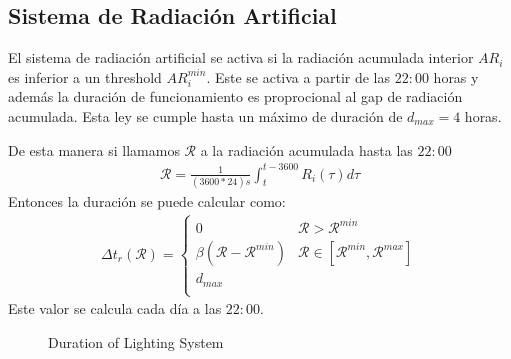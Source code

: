 \documentclass{article}
\newcommand{\R}{\mathcal{R}}
\begin{document}
\subsection{Sistema de Radiación Artificial}

El sistema de radiación artificial se activa si la radiación acumulada interior $AR_i$ es inferior a un threshold $AR_i^{min}$. Este se activa a partir de las $22:00$ horas y además la duración de funcionamiento es proprocional al gap de radiación acumulada. Esta ley se cumple hasta un máximo de duración de $d_{max}=4$ horas.

De esta manera si llamamos $\R$ a la radiación acumulada hasta las $22:00$
\begin{gather}
    \R = \frac{1}{(3600*24) s}\int_{t}^{t-3600} R_i(\tau)d\tau
\end{gather}
Entonces la duración se puede calcular como:
\begin{gather}
    \Delta t_r(\R) =        
    \begin{cases}
        0 & \R > \R^{min} \\
        \beta(\R-\R^{min}) & \R \in [\R^{min},\R^{max}] \\
        d_{max} \\
    \end{cases}
\end{gather}
Este valor se calcula cada día a las $22:00$.

\begin{figure}[ht!]
    \centering
        \caption{Duration of Lighting System}
        \label{figure:HeatLaw}
\end{figure}
\end{document}
